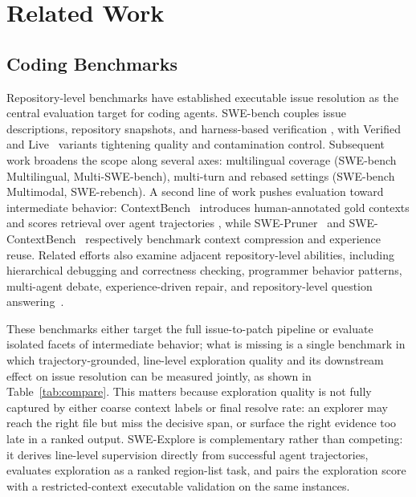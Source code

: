 \section{Related Work}
\subsection{Coding Benchmarks}

Repository-level benchmarks have established executable issue resolution as the central evaluation target for coding agents. SWE-bench couples issue descriptions, repository snapshots, and harness-based verification \citep{jimenez2024swebench}, with Verified~\citep{chowdhury2024swebenchverified} and Live~\citep{zhang2025swebenchgoeslive} variants tightening quality and contamination control. Subsequent work broadens the scope along several axes: multilingual coverage (SWE-bench Multilingual\citep{yang2025swesmith}, Multi-SWE-bench\citep{zan2025multiswebenchmultilingualbenchmarkissue}), multi-turn and rebased settings (SWE-bench Multimodal\citep{yang2025swebench}, SWE-rebench\citep{badertdinov2025swerebenchautomatedpipelinetask}). A second line of work pushes evaluation toward intermediate behavior: ContextBench~\citep{li2026contextbench} introduces human-annotated gold contexts and scores retrieval over agent trajectories \citep{li2026contextbench}, while SWE-Pruner~\citep{wang2026swepruner}  and SWE-ContextBench~\citep{zhu2026swecontextbench} respectively benchmark context compression and experience reuse. Related efforts also examine adjacent repository-level abilities, including hierarchical debugging and correctness checking, programmer behavior patterns, multi-agent debate, experience-driven repair, and repository-level question answering~\citep{shi2024code,shi2025between,li2025swe,chen2025swe,peng2025swe}.

These benchmarks either target the full issue-to-patch pipeline or evaluate isolated facets of intermediate behavior; what is missing is a single benchmark in which trajectory-grounded, line-level exploration quality and its downstream effect on issue resolution can be measured jointly, as shown in Table~\ref{tab:compare}. This matters because exploration quality is not fully captured by either coarse context labels or final resolve rate: an explorer may reach the right file but miss the decisive span, or surface the right evidence too late in a ranked output. SWE-Explore is complementary rather than competing: it derives line-level supervision directly from successful agent trajectories, evaluates exploration as a ranked region-list task, and pairs the exploration score with a restricted-context executable validation on the same instances.

